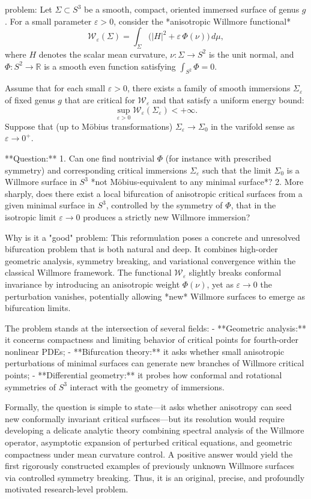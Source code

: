 problem:  
Let $\Sigma\subset S^3$ be a smooth, compact, oriented immersed surface of genus $g$.  
For a small parameter $\varepsilon>0$, consider the *anisotropic Willmore functional*  
\[
\mathcal{W}_\varepsilon(\Sigma) = \int_\Sigma \big(|H|^2 + \varepsilon\,\Phi(\nu)\big)\, d\mu,
\]
where $H$ denotes the scalar mean curvature, $\nu:\Sigma\to S^2$ is the unit normal, and $\Phi:S^2\to\mathbb{R}$ is a smooth even function satisfying $\int_{S^2}\Phi=0$.  

Assume that for each small $\varepsilon>0$, there exists a family of smooth immersions $\Sigma_\varepsilon$ of fixed genus $g$ that are critical for $\mathcal{W}_\varepsilon$ and that satisfy a uniform energy bound:
\[
\sup_{\varepsilon>0}\mathcal{W}_\varepsilon(\Sigma_\varepsilon) < +\infty.
\]
Suppose that (up to Möbius transformations) $\Sigma_\varepsilon \to \Sigma_0$ in the varifold sense as $\varepsilon \to 0^+$.  

**Question:**  
1. Can one find nontrivial $\Phi$ (for instance with prescribed symmetry) and corresponding critical immersions $\Sigma_\varepsilon$ such that the limit $\Sigma_0$ is a Willmore surface in $S^3$ *not Möbius-equivalent to any minimal surface*?  
2. More sharply, does there exist a local bifurcation of anisotropic critical surfaces from a given minimal surface in $S^3$, controlled by the symmetry of $\Phi$, that in the isotropic limit $\varepsilon\to0$ produces a strictly new Willmore immersion?

Why is it a "good" problem:  
This reformulation poses a concrete and unresolved bifurcation problem that is both natural and deep. It combines high-order geometric analysis, symmetry breaking, and variational convergence within the classical Willmore framework. The functional $\mathcal{W}_\varepsilon$ slightly breaks conformal invariance by introducing an anisotropic weight $\Phi(\nu)$, yet as $\varepsilon\to0$ the perturbation vanishes, potentially allowing *new* Willmore surfaces to emerge as bifurcation limits.

The problem stands at the intersection of several fields:
- **Geometric analysis:** it concerns compactness and limiting behavior of critical points for fourth-order nonlinear PDEs;
- **Bifurcation theory:** it asks whether small anisotropic perturbations of minimal surfaces can generate new branches of Willmore critical points;
- **Differential geometry:** it probes how conformal and rotational symmetries of $S^3$ interact with the geometry of immersions.

Formally, the question is simple to state—it asks whether anisotropy can seed new conformally invariant critical surfaces—but its resolution would require developing a delicate analytic theory combining spectral analysis of the Willmore operator, asymptotic expansion of perturbed critical equations, and geometric compactness under mean curvature control. A positive answer would yield the first rigorously constructed examples of previously unknown Willmore surfaces via controlled symmetry breaking. Thus, it is an original, precise, and profoundly motivated research-level problem.